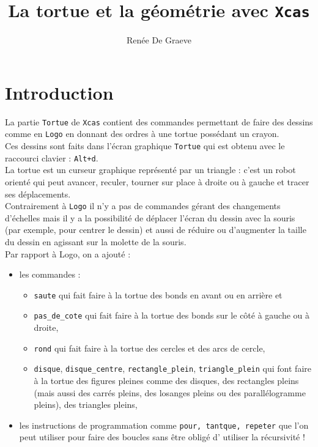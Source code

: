 \documentclass[a4paper,11pt]{book}
\title{La tortue et la g\'eom\'etrie avec {\tt Xcas}}
\author{Ren\'ee De Graeve}
\begin{document}
\maketitle
\chapter*{Introduction}
La partie {\tt Tortue} de {\tt Xcas} contient des commandes permettant de faire
des dessins comme en {\tt Logo} en donnant des ordres \`a une tortue
 poss\'edant un crayon.\\
Ces dessins sont faits dans l'\'ecran graphique {\tt Tortue} qui est
obtenu avec le raccourci clavier : {\tt Alt+d}.\\

La tortue est un curseur graphique repr\'esent\'e par un triangle : 
c'est un robot orient\'e qui peut avancer, reculer, tourner sur place \`a 
droite ou \`a gauche et tracer ses d\'eplacements.\\
Contrairement \`a {\tt Logo} il n'y a pas de commandes g\'erant des changements
d'\'echelles mais il y a la possibilit\'e de d\'eplacer l'\'ecran du dessin 
avec la souris (par exemple, pour centrer le dessin) et aussi de r\'eduire 
ou d'augmenter la taille du dessin en agissant sur la molette de la souris.\\
Par rapport \`a Logo, on a ajout\'e :
\begin{itemize}
\item les commandes :
\begin{itemize}
\item{\tt saute} qui fait faire \`a la tortue des bonds en avant ou en arri\`ere et
\item {\tt pas\_de\_cote} qui fait faire \`a la 
tortue des bonds sur le c\^ot\'e  \`a gauche  ou \`a droite,
\item {\tt rond} qui fait faire \`a la tortue des cercles et des arcs de cercle,
\item {\tt disque}, {\tt disque\_centre}, {\tt rectangle\_plein},
{\tt triangle\_plein}
 qui font faire \`a la tortue des figures pleines comme des disques, des 
rectangles pleins (mais aussi des carr\'es pleins, des losanges pleins ou des parall\'elogramme pleins), des triangles pleins,
\end{itemize}
\item les instructions de programmation comme {\tt pour, tantque, repeter} que 
l'on peut utiliser pour faire des boucles sans \^etre oblig\'e d' utiliser la 
r\'ecursivit\'e !
\end{itemize}
\end{document}
